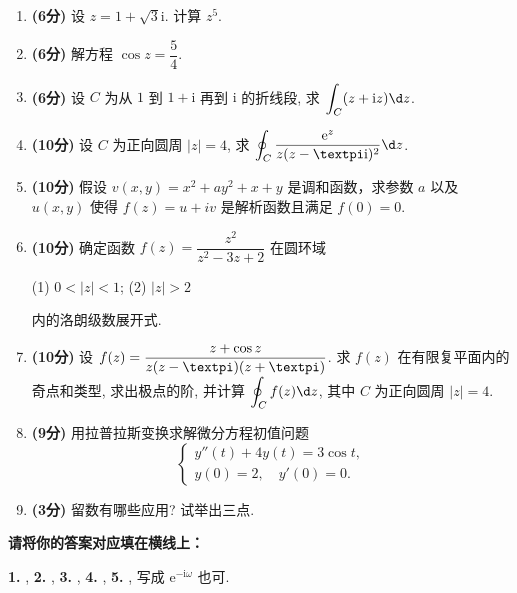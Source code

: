 \documentclass[simple]{hfutexam}
\let\Im\relax\DeclareMathOperator{\Im}{Im}
\let\Re\relax\DeclareMathOperator{\Re}{Re}
\newcommand{\ii}{\mathrm{i}}
\newcommand{\jj}{\mathrm{j}}
\newcommand{\ee}{\mathrm{e}}
\newcommand{\cpi}{{\text{\textpi}}}
\newcommand{\dint}{\displaystyle\int}
\newcommand{\doint}{\displaystyle\oint}
\begin{document}
\begin{enumerate}
\item \textbf{(6分)} 设 $z=1+\sqrt3\ii$. 计算 $z^5$.
\item \textbf{(6分)} 解方程 $\cos z=\dfrac54$.
\item \textbf{(6分)} 设 $C$ 为从 $1$ 到 $1+\ii$ 再到 $\ii$ 的折线段, 求 $\dint_C (\Re z+\ii\Im z) \d z$.
\item \textbf{(10分)} 设 $C$ 为正向圆周 $|z|=4$, 求 $\doint_C\frac{\ee^z}{z(z-\cpi\ii)^2}\d z$.
\item \textbf{(10分)} 假设 $v(x,y)=x^2+ay^2+x+y$ 是调和函数，求参数 $a$ 以及 $u(x,y)$ 使得 $f(z)=u+iv$ 是解析函数且满足 $f(0)=0$.
\item \textbf{(10分)} 确定函数 $f(z)=\dfrac{z^2}{z^2-3z+2}$ 在圆环域\par
(1) $0<|z|<1$; \hspace{2em} (2) $|z|>2$\par
内的洛朗级数展开式.
\item \textbf{(10分)} 设 $f(z)=\dfrac{z+\cos z}{z(z-\cpi)(z+\cpi)}$. 求 $f(z)$ 在有限复平面内的奇点和类型, 求出极点的阶, 并计算 $\doint_{C}f(z)\d z$, 其中 $C$ 为正向圆周 $|z|=4$.
\item \textbf{(9分)} 用拉普拉斯变换求解微分方程初值问题
\[\begin{cases}
y''(t)+4y(t)=3\cos t,\\
y(0)=2,\quad y'(0)=0.
\end{cases}\]
\item \textbf{(3分)} 留数有哪些应用? 试举出三点.
\end{enumerate}


\newpage
{}
\ZhuanYeBanJi{}
\maketitle



\textbf{请将你的答案对应填在横线上：}

\textbf{1.} \fillblank[2cm]{$2+3\ii$}, 
\textbf{2.} \fillblank[2cm]{$-\dfrac{\cpi}2$}, 
\textbf{3.} , 
\textbf{4.} , 
\textbf{5.} \fillblank[1.7cm]{$\ee^{-\jj \omega}$}, 写成 $\ee^{-\ii\omega}$ 也可.
\end{document}
